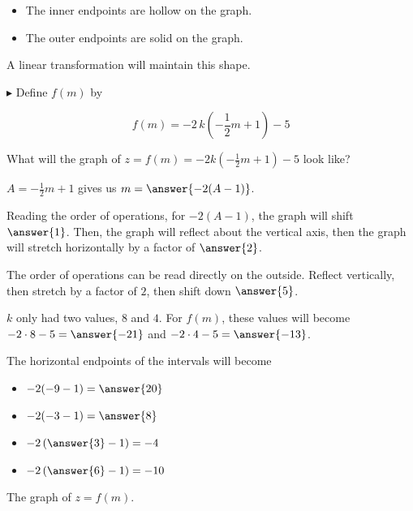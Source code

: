 \documentclass{ximera}
\begin{document}
\begin{example}
\begin{itemize}
\item The inner endpoints are hollow on the graph.

\item The outer endpoints are solid on the graph.


\end{itemize}

A linear transformation will maintain this shape. 





$\blacktriangleright$  Define $f(m)$ by 


\[
f(m) = -2 \, k\left(-\frac{1}{2} m + 1\right) - 5
\]



What will the graph of $z = f(m) = -2 k\left(-\frac{1}{2} m + 1\right) - 5$ look like? 



$A = -\frac{1}{2} m + 1$  gives us $m = \answer{-2(A-1)}$. 

Reading the order of operations, for $-2(A-1)$, the graph will shift  $\answer{1}$. Then, the graph will reflect about the vertical axis, then the graph will stretch horizontally by a factor of $\answer{2}$.



The order of operations can be read directly on the outside.  Reflect vertically, then stretch by a factor of $2$, then shift down $\answer{5}$.

$k$ only had two values, $8$ and $4$. For $f(m)$, these values will become $-2 \cdot 8 - 5 = \answer{-21}$ and $-2 \cdot 4 - 5 = \answer{-13}$.  

The horizontal endpoints of the intervals will become


\begin{itemize}
\item $-2(-9-1) = \answer{20}$
\item $-2(-3-1) = \answer{8}$
\item $-2 \left( \answer{3}-1 \right) = -4$
\item $-2 \left(\answer{6}-1 \right) = -10$
\end{itemize}






The graph of $z = f(m)$.





\end{example}
\end{document}
